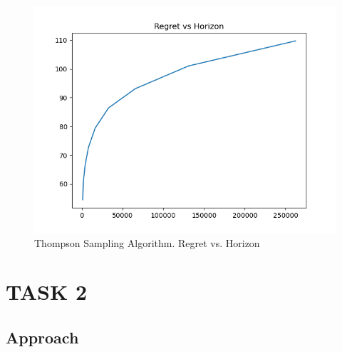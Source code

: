 \documentclass{article}
\begin{document}
\begin{figure}[hb]
    \centering
    \includegraphics[width=0.68\linewidth]{../imgs/task1-Thompson_Sampling-20250218-164801.png}
    \caption{Thompson Sampling Algorithm. Regret vs. Horizon}\label{fig:thompson sampling}
\end{figure}


\newpage
\section*{TASK 2}
\subsection{Approach}
\end{document}
